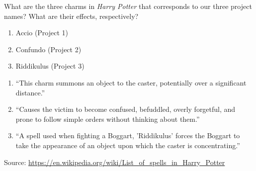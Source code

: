 \documentclass{report}
\begin{document}
\clearpage
\begin{problem}

What are the three charms in \emph{Harry Potter} that corresponds to our three
project names? What are their effects, respectively?

\begin{enumerate}
\item Accio (Project 1)
\item Confundo (Project 2)
\item Riddikulus (Project 3)
\end{enumerate}

\begin{answer}{24em}
  \begin{enumerate}
    \item ``This charm summons an object to the caster, potentially over
           a significant distance.''
    \item ``Causes the victim to become confused, befuddled, overly forgetful, and
          prone to follow simple orders without thinking about them.''
    \item ``A spell used when fighting a Boggart, 'Riddikulus' forces the
          Boggart to take the appearance of an object upon which the caster is
          concentrating.''
  \end{enumerate}
  Source: \url{https://en.wikipedia.org/wiki/List_of_spells_in_Harry_Potter}
\end{answer}

\end{problem}
\end{document}
